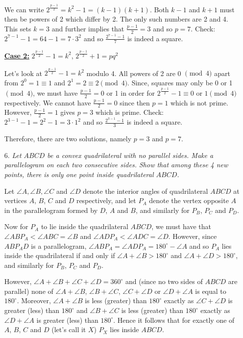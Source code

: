 \documentclass[a4paper,12pt]{article}
\begin{document}
\begin{enumerate}
  We can write $2^\frac{p-1}{2} = k^2-1 = (k-1)(k+1)$. Both $k-1$ and $k+1$ must then be powers of 2 which differ by 2. The only such numbers are 2 and 4. This sets $k=3$ and further implies that $\frac{p-1}{2}=3$ and so $p=7$. Check: $2^{7-1}-1 = 64-1 = 7\cdot 3^2$ and so $\frac{2^{7-1}-1}{7}$ is indeed a square.
  
  \underline{\textbf{Case 2:}} $2^\frac{p-1}{2}-1=k^2$, $2^\frac{p-1}{2}+1 = pq^2$
  
  Let's look at $2^\frac{p-1}{2}-1=k^2$ modulo 4. All powers of 2 are 0 $\pmod{4}$ apart from $2^0=1 \equiv 1$ and $2^1=2 \equiv 2 \pmod{4}$. Since, squares may only be 0 or 1 $\pmod{4}$, we must have $\frac{p-1}{2} = 0$ or 1 in order for $2^\frac{p-1}{2}-1 \equiv 0$ or $1 \pmod{4}$ respectively. We cannot have $\frac{p-1}{2} = 0$ since then $p=1$ which is not prime. However, $\frac{p-1}{2} = 1$ gives $p=3$ which is prime. Check: $2^{3-1}-1 = 2^2-1 = 3\cdot 1^2$ and so $\frac{2^{3-1}-1}{3}$ is indeed a square. 
  
  Therefore, there are two solutions, namely $p=3$ and $p=7$.
  
  
  \item[6.] \emph{Let $ABCD$ be a convex quadrilateral with no parallel sides. Make a parallelogram on each two consecutive sides. Show that among these 4 new points, there is only one point inside quadrilateral $ABCD$.}
  
  Let $\angle A, \angle B, \angle C$ and $\angle D$ denote the interior angles of quadrilateral $ABCD$ at vertices $A$, $B$, $C$ and $D$ respectively, and let $P_A$ denote the vertex opposite $A$ in the parallelogram formed by $D$, $A$ and $B$, and similarly for $P_B$, $P_C$ and $P_D$.
  
  Now for $P_A$ to lie inside the quadrilateral $ABCD$, we must have that $\angle ABP_A < \angle ABC = \angle B$ and $\angle ADP_A < \angle ADC = \angle D$. However, since $ABP_AD$ is a parallelogram, $\angle ABP_A = \angle ADP_A = 180^\circ - \angle A$ and so $P_A$ lies inside the quadrilateral if and only if $\angle A + \angle B > 180^\circ$ and $\angle A + \angle D > 180^\circ$, and similarly for $P_B$, $P_C$ and $P_D$.
  
  However, $\angle A + \angle B + \angle C + \angle D = 360^\circ$ and (since no two sides of $ABCD$ are parallel) none of $\angle A + \angle B$, $\angle B + \angle C$, $\angle C + \angle D$ or $\angle D + \angle A$ is equal to $180^\circ$. Moreover, $\angle A + \angle B$ is less (greater) than $180^\circ$ exactly as $\angle C + \angle D$ is greater (less) than $180^\circ$ and $\angle B + \angle C$ is less (greater) than $180^\circ$ exactly as $\angle D + \angle A$ is greater (less) than $180^\circ$. Hence it follows that for exactly one of $A$, $B$, $C$ and $D$ (let's call it $X$) $P_X$ lies inside $ABCD$.
  
  
\end{enumerate}


\centering
\begin{BVerbatim}
\end{BVerbatim}
\end{document}
